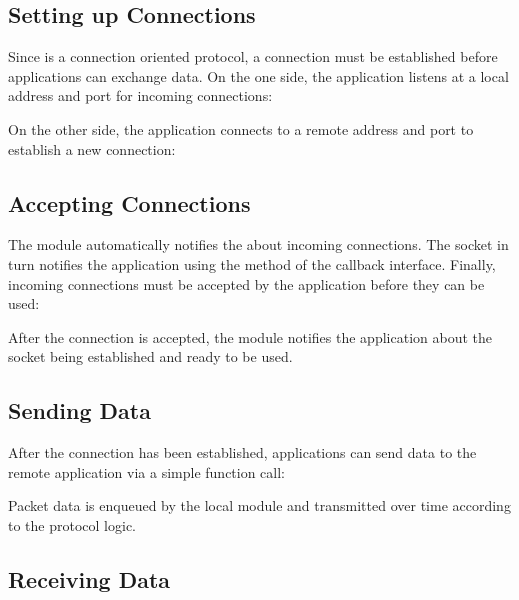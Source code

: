 \subsection*{Setting up Connections}

Since  is a connection oriented protocol, a connection must be
established before applications can exchange data. On the one side, the
application listens at a local address and port for incoming 
connections:


On the other side, the application connects to a remote address and port to
establish a new connection:


\subsection*{Accepting Connections}

The  module automatically notifies the  about
incoming connections. The socket in turn notifies the application using the
 method of the callback interface. Finally,
incoming  connections must be accepted by the application before
they can be used:


After the connection is accepted, the  module notifies the
application about the socket being established and ready to be used.

\subsection*{Sending Data}

After the connection has been established, applications can send data to the
remote application via a simple function call:


Packet data is enqueued by the local  module and transmitted
over time according to the protocol logic.

\subsection*{Receiving Data}

